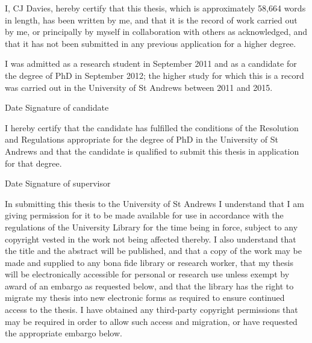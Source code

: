 

I, CJ Davies, hereby certify that this thesis, which is approximately 58,664 words in length, has been written by me, and that it is the record of work carried out by me, or principally by myself in collaboration with others as acknowledged, and that it has not been submitted in any previous application for a higher degree. 

I was admitted as a research student in September 2011 and as a candidate for the degree of PhD in September 2012; the higher study for which this is a record was carried out in the University of St Andrews between 2011 and 2015. 

\vspace{5mm}

Date \hspace{35mm} Signature of candidate

\vspace{10mm}



I hereby certify that the candidate has fulfilled the conditions of the Resolution and Regulations appropriate for the degree of PhD in the University of St Andrews and that the candidate is qualified to submit this thesis in application for that degree. 

\vspace{5mm}

Date \hspace{35mm} Signature of supervisor

\vspace{10mm}



In submitting this thesis to the University of St Andrews I understand that I am giving permission for it to be made available for use in accordance with the regulations of the University Library for the time being in force, subject to any copyright vested in the work not being affected thereby.  I also understand that the title and the abstract will be published, and that a copy of the work may be made and supplied to any bona fide library or research worker, that my thesis will be electronically accessible for personal or research use unless exempt by award of an embargo as requested below, and that the library has the right to migrate my thesis into new electronic forms as required to ensure continued access to the thesis. I have obtained any third-party copyright permissions that may be required in order to allow such access and migration, or have requested the appropriate embargo below. 

